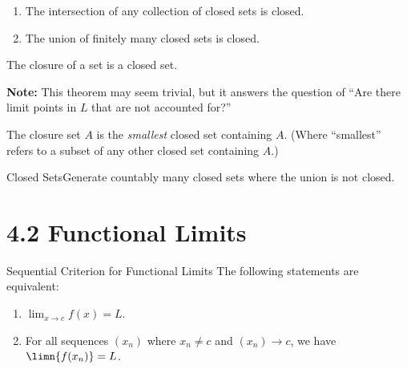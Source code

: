 \begin{theorem}
    \begin{enumerate}[label=(\roman*)]
        \item The intersection of any collection of closed sets is closed.
        \item The union of finitely many closed sets is closed.
    \end{enumerate}
\end{theorem}

\begin{theorem}
    The closure of a set is a closed set.
\end{theorem}

\textbf{Note:} This theorem may seem trivial, but it answers the question of ``Are there limit points in \(L\) that are not accounted for?''

\begin{theorem}
    The closure set \(A\) is the \textit{smallest} closed set containing \(A\). (Where ``smallest'' refers to a subset of any other closed set containing \(A\).)
\end{theorem}

\begin{example}
    {Closed Sets}Generate countably many closed sets where the union is not closed.
\end{example}



\newcommand{\limc}[1]{\lim_{x \rightarrow c}#1}

\newcommand{\ninn}{n \in \N}
\section{4.2 Functional Limits}



\begin{ntheorem}
    {Sequential Criterion for Functional Limits}
    The following statements are equivalent:

    \begin{enumerate}
        \item \(\lim_{x \rightarrow c} f(x) = L\).
        \item For all sequences \((x_n)\) where \(x_n \ne c\) and \((x_n) \rightarrow c\), we have \(\limn{f(x_n)} = L\).
    \end{enumerate}
\end{ntheorem}

